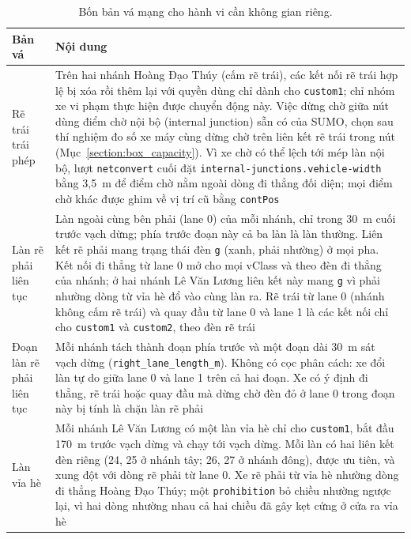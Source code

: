 \documentclass[../DoAn.tex]{subfiles}
\begin{document}
\begin{table}[ht]
\centering
\small
\caption{Bốn bản vá mạng cho hành vi cần không gian riêng.}
\label{table:3.0}
\begin{tabular}{|p{3.0cm}|p{11cm}|}
\hline
\textbf{Bản vá} & \textbf{Nội dung} \\
\hline
Rẽ trái trái phép & Trên hai nhánh Hoàng Đạo Thúy (cấm rẽ trái), các kết nối rẽ trái hợp lệ bị xóa rồi thêm lại với quyền dùng chỉ dành cho \texttt{custom1}; chỉ nhóm xe vi phạm thực hiện được chuyển động này. Việc dừng chờ giữa nút dùng điểm chờ nội bộ (internal junction) sẵn có của SUMO, chọn sau thí nghiệm đo số xe máy cùng dừng chờ trên liên kết rẽ trái trong nút (Mục~\ref{section:box_capacity}). Vì xe chờ có thể lệch tới mép làn nội bộ, lượt \texttt{netconvert} cuối đặt \texttt{internal-junctions.vehicle-width} bằng 3,5~m để điểm chờ nằm ngoài dòng đi thẳng đối diện; mọi điểm chờ khác được ghim về vị trí cũ bằng \texttt{contPos} \\
\hline
Làn rẽ phải liên tục & Làn ngoài cùng bên phải (lane 0) của mỗi nhánh, chỉ trong 30~m cuối trước vạch dừng; phía trước đoạn này cả ba làn là làn thường. Liên kết rẽ phải mang trạng thái đèn \texttt{g} (xanh, phải nhường) ở mọi pha. Kết nối đi thẳng từ lane 0 mở cho mọi vClass và theo đèn đi thẳng của nhánh; ở hai nhánh Lê Văn Lương liên kết này mang \texttt{g} vì phải nhường dòng từ vỉa hè đổ vào cùng làn ra. Rẽ trái từ lane 0 (nhánh không cấm rẽ trái) và quay đầu từ lane 0 và lane 1 là các kết nối chỉ cho \texttt{custom1} và \texttt{custom2}, theo đèn rẽ trái \\
\hline
Đoạn làn rẽ phải liên tục & Mỗi nhánh tách thành đoạn phía trước và một đoạn dài 30~m sát vạch dừng (\texttt{right\_lane\_length\_m}). Không có cọc phân cách: xe đổi làn tự do giữa lane 0 và lane 1 trên cả hai đoạn. Xe có ý định đi thẳng, rẽ trái hoặc quay đầu mà dừng chờ đèn đỏ ở lane 0 trong đoạn này bị tính là chặn làn rẽ phải \\
\hline
Làn vỉa hè & Mỗi nhánh Lê Văn Lương có một làn vỉa hè chỉ cho \texttt{custom1}, bắt đầu 170~m trước vạch dừng và chạy tới vạch dừng. Mỗi làn có hai liên kết đèn riêng (24, 25 ở nhánh tây; 26, 27 ở nhánh đông), được ưu tiên, và xung đột với dòng rẽ phải từ lane 0. Xe rẽ phải từ vỉa hè nhường dòng đi thẳng Hoàng Đạo Thúy; một \texttt{prohibition} bỏ chiều nhường ngược lại, vì hai dòng nhường nhau cả hai chiều đã gây kẹt cứng ở cửa ra vỉa hè \\
\hline
\end{tabular}
\end{table}
\end{document}
